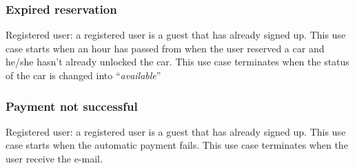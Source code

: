 \subsubsection{Expired reservation}
\begin{UseCase}
	{Registered user: a registered user is a guest that has already signed up.}
	{This use case starts when an hour has passed from when the user reserved a car and he/she hasn't already unlocked the car.}
	{
	}
	{This use case terminates when the status of the car is changed into ``\textit{available}''}{}
\end{UseCase}

\subsubsection{Payment not successful}
\begin{UseCase}
	{Registered user: a registered user is a guest that has already signed up.}
	{This use case starts when the automatic payment fails.}
	{
	}
	{This use case terminates when the user receive the e-mail.}{}
\end{UseCase}


